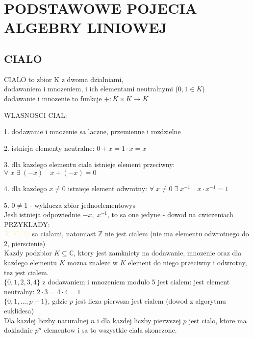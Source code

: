 \documentclass{article}
\newcommand{\R}{\mathbb{R}}
\newcommand{\Q}{\mathbb{Q}}
\newcommand{\Z}{\mathbb{Z}}
\newcommand{\C}{\mathbb{C}}
\begin{document}
\pagecolor{back}\color{txt}\ttfamily
\section*{PODSTAWOWE POJECIA ALGEBRY LINIOWEJ}
\subsection*{CIALO}
  \begin{center}
    \color{def}CIALO \color{txt}to zbior K z dwoma dzialniami, \\
    dodawaniem i mnozeniem, i ich elementami neutralnymi ($0,1\in K$)\smallskip\\
    dodawanie i mnozenie to funkcje $+:K\times K\to K$
  \end{center}
  \color{def}WLASNOSCI CIAL:\color{txt}\smallskip\par
    1. dodawanie i mnozenie sa laczne, przemienne i rozdzielne\smallskip\par
    2. istnieja elementy neutralne: $0+x=1\cdot x=x$\smallskip\par
    3. dla kazdego elementu ciala istnieje element przeciwny: $\forall\;x\;\exists\;(-x)\quad x+(-x)=0$\smallskip\par
    4. dla kazdego $x\neq0$ istnieje element odwrotny: $\forall\;x\neq0\;\exists\;x^{-1}\quad x\cdot x^{-1}=1$\smallskip\par
    5. $0\neq1$ - wyklucza zbior jednoelementowys\medskip\\
  Jesli istnieja odpowiednie $-x, \;x^{-1}$, to sa one jedyne - \color{tit}dowod na cwiczeniach\color{txt}\bigskip\\
  \color{emp}PRZYKLADY:\color{txt}\smallskip\\
  $\color{acc}\R, \;\C,\;\Q$ sa cialami, natomiast $\Z$ nie jest cialem (nie ma elementu odwrotnego do 2, \color{tit}pierscienie\color{txt})\medskip\\
  Kazdy podzbior \color{acc}$K\subseteq\C$, ktory jest zamkniety na \color{txt}dodawanie, mnozenie oraz dla kazdego elementu $K$ mozna znalezc w $K$ element do niego przeciwny i odwrotny, tez jest cialem.\medskip\\
  $\{0, 1, 2, 3, 4\}$ z dodawaniem i mnozeniem modulo 5 jest cialem: jest element neutralny: $2\cdot3=4\cdot4=1$\smallskip\\
  $\{0, 1,..., p-1\}$, gdzie $p$ jest licza pierwsza jest cialem (\color{tit}dowod z algorytmu euklidesa\color{txt})\medskip\\
  Dla kazdej liczby naturalnej $n$ i dla kazdej liczby pierwszej $p$ jest cialo, ktore ma dokladnie $p^n$ elementow i sa to wszystkie ciala skonczone.\medskip\\
\end{document}
